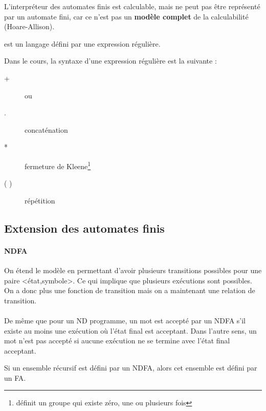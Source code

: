 \begin{myprop}
	L'interpréteur des automates finis est calculable, mais ne peut pas être
	représenté par un automate fini, car ce n'est pas un \textbf{modèle
	complet} de la calculabilité (Hoare-Allison).
\end{myprop}

\begin{mydef} est un langage défini par une expression
	régulière.
\end{mydef}

\begin{mydef}
       	Dans le cours, la syntaxe d'une expression régulière est la suivante :
	\begin{description}
		\item[+] ou
		\item[.] concaténation
		\item[*] fermeture de Kleene\footnote{définit un groupe qui existe zéro, une ou plusieurs fois}
		\item[( )] répétition
	\end{description}
\end{mydef}



\subsection{Extension des automates finis}
\label{ssub:automate_fini_nd}
\paragraph{NDFA} On étend le modèle en permettant d'avoir plusieurs transitions possibles pour
une paire <état,symbole>. Ce qui implique que plusieurs exécutions sont
possibles. On a donc plus une fonction de transition mais on a maintenant une
relation de transition.

\paragraph{} De même que pour un ND programme, un mot est accepté par un NDFA
s'il existe au moins une exécution où l'état final est acceptant. Dans l'autre
sens, un
mot n'est pas accepté si aucune exécution ne se termine avec l'état final
acceptant.

\begin{myprop}
	Si un ensemble récursif est défini par un NDFA, alors cet ensemble est
	défini par un FA.
\end{myprop}

